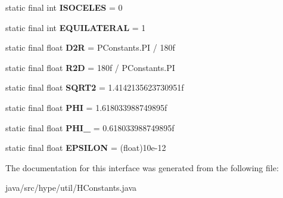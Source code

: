 \begin{DoxyCompactItemize}
\item 
\hypertarget{interfacehype_1_1util_1_1_h_constants_a46aacafd0bfd088dd23ff151106674c3}{static final int {\bfseries I\-S\-O\-C\-E\-L\-E\-S} = 0}\label{interfacehype_1_1util_1_1_h_constants_a46aacafd0bfd088dd23ff151106674c3}

\item 
\hypertarget{interfacehype_1_1util_1_1_h_constants_a1d9dbd4ac52de3b1fc2feb6c234c747f}{static final int {\bfseries E\-Q\-U\-I\-L\-A\-T\-E\-R\-A\-L} = 1}\label{interfacehype_1_1util_1_1_h_constants_a1d9dbd4ac52de3b1fc2feb6c234c747f}

\item 
\hypertarget{interfacehype_1_1util_1_1_h_constants_a5ed71fb4b47e5babb0bba63b4bb0c5fa}{static final float {\bfseries D2\-R} = P\-Constants.\-P\-I / 180f}\label{interfacehype_1_1util_1_1_h_constants_a5ed71fb4b47e5babb0bba63b4bb0c5fa}

\item 
\hypertarget{interfacehype_1_1util_1_1_h_constants_a7ce3b8de220fac7fcd9c35758912dc90}{static final float {\bfseries R2\-D} = 180f / P\-Constants.\-P\-I}\label{interfacehype_1_1util_1_1_h_constants_a7ce3b8de220fac7fcd9c35758912dc90}

\item 
\hypertarget{interfacehype_1_1util_1_1_h_constants_a6dd14b2b18bcb7b28751d7df61b3297b}{static final float {\bfseries S\-Q\-R\-T2} = 1.\-4142135623730951f}\label{interfacehype_1_1util_1_1_h_constants_a6dd14b2b18bcb7b28751d7df61b3297b}

\item 
\hypertarget{interfacehype_1_1util_1_1_h_constants_ae09a355ec56553ad5f3fe11fa67c49ed}{static final float {\bfseries P\-H\-I} = 1.\-618033988749895f}\label{interfacehype_1_1util_1_1_h_constants_ae09a355ec56553ad5f3fe11fa67c49ed}

\item 
\hypertarget{interfacehype_1_1util_1_1_h_constants_a1d71bbb29142357c1db975fe388751a8}{static final float {\bfseries P\-H\-I\-\_} = 0.\-618033988749895f}\label{interfacehype_1_1util_1_1_h_constants_a1d71bbb29142357c1db975fe388751a8}

\item 
\hypertarget{interfacehype_1_1util_1_1_h_constants_a2eedba9bfbb2bb9235b7c4c72432db30}{static final float {\bfseries E\-P\-S\-I\-L\-O\-N} = (float)10e-\/12}\label{interfacehype_1_1util_1_1_h_constants_a2eedba9bfbb2bb9235b7c4c72432db30}

\end{DoxyCompactItemize}


The documentation for this interface was generated from the following file\-:\begin{DoxyCompactItemize}
\item 
java/src/hype/util/H\-Constants.\-java\end{DoxyCompactItemize}
